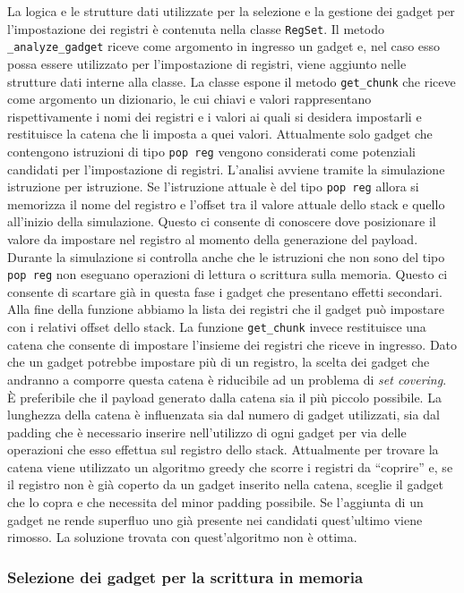La logica e le strutture dati utilizzate per la selezione e la
gestione dei gadget per l'impostazione dei registri è contenuta nella
classe \lstinline{RegSet}. Il metodo \lstinline{_analyze_gadget}
riceve come argomento in ingresso un gadget e, nel caso esso possa
essere utilizzato per l'impostazione di registri, viene aggiunto nelle
strutture dati interne alla classe. La classe espone il metodo
\lstinline{get_chunk} che riceve come argomento un dizionario, le cui
chiavi e valori rappresentano rispettivamente i nomi dei registri e i
valori ai quali si desidera impostarli e restituisce la catena che li
imposta a quei valori. Attualmente solo gadget che contengono
istruzioni di tipo \lstinline{pop reg} vengono considerati come
potenziali candidati per l'impostazione di registri. L'analisi avviene
tramite la simulazione istruzione per istruzione. Se l'istruzione
attuale è del tipo \lstinline{pop reg} allora si memorizza il nome del
registro e l'offset tra il valore attuale dello stack e quello
all'inizio della simulazione. Questo ci consente di conoscere dove
posizionare il valore da impostare nel registro al momento della
generazione del payload. Durante la simulazione si controlla anche che
le istruzioni che non sono del tipo \lstinline{pop reg} non eseguano
operazioni di lettura o scrittura sulla memoria. Questo ci consente di
scartare già in questa fase i gadget che presentano effetti
secondari. Alla fine della funzione abbiamo la lista dei registri che
il gadget può impostare con i relativi offset dello stack. La funzione
\lstinline{get_chunk} invece restituisce una catena che consente di
impostare l'insieme dei registri che riceve in ingresso. Dato che un
gadget potrebbe impostare più di un registro, la scelta dei gadget che
andranno a comporre questa catena è riducibile ad un problema di
\emph{set covering}. È preferibile che il payload generato dalla
catena sia il più piccolo possibile. La lunghezza della catena è
influenzata sia dal numero di gadget utilizzati, sia dal padding che è
necessario inserire nell'utilizzo di ogni gadget per via delle
operazioni che esso effettua sul registro dello stack. Attualmente per
trovare la catena viene utilizzato un algoritmo greedy che scorre i
registri da ``coprire'' e, se il registro non è già coperto da un
gadget inserito nella catena, sceglie il gadget che lo copra e che
necessita del minor padding possibile. Se l'aggiunta di un gadget ne
rende superfluo uno già presente nei candidati quest'ultimo viene
rimosso. La soluzione trovata con quest'algoritmo non è ottima.

\subsubsection{Selezione dei gadget per la scrittura in memoria}

